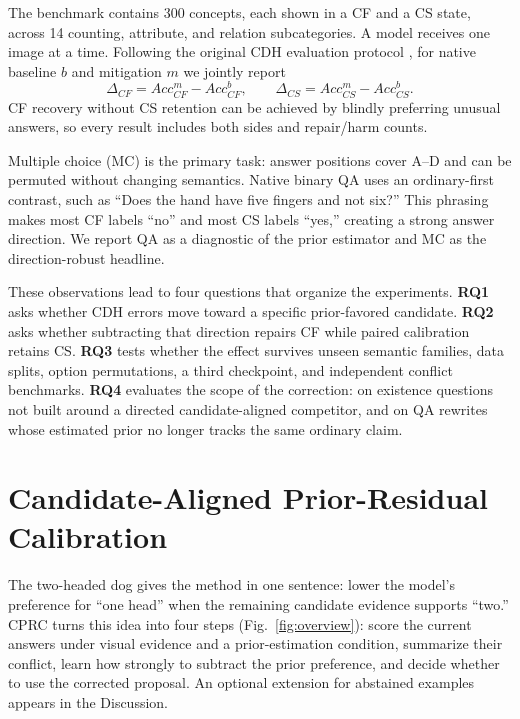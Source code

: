 \documentclass[letterpaper]{article}
\begin{document}
The benchmark contains 300 concepts, each shown in a CF and a CS state, across
14 counting, attribute, and relation subcategories. A model receives one image
at a time. Following the original CDH evaluation protocol
\cite{chen2026cdh}, for native baseline $b$ and mitigation $m$ we jointly
report
\begin{equation}
\Delta_{CF}=Acc^{m}_{CF}-Acc^{b}_{CF},\qquad
\Delta_{CS}=Acc^{m}_{CS}-Acc^{b}_{CS}.
\label{eq:deltas}
\end{equation}
CF recovery without CS retention can be achieved by blindly preferring unusual
answers, so every result includes both sides and repair/harm counts.

Multiple choice (MC) is the primary task: answer positions cover A--D and can
be permuted without changing semantics. Native binary QA uses an ordinary-first
contrast, such as ``Does the hand have five fingers and not six?'' This phrasing
makes most CF labels ``no'' and most CS labels ``yes,'' creating a strong answer
direction. We report QA as a diagnostic of the prior estimator and MC
as the direction-robust headline.

These observations lead to four questions that organize the experiments.
\textbf{RQ1} asks whether CDH errors move toward a specific prior-favored candidate.
\textbf{RQ2} asks whether subtracting that direction repairs CF while paired
calibration retains CS. \textbf{RQ3} tests whether the effect survives unseen
semantic families, data splits, option permutations, a third checkpoint, and
independent conflict benchmarks.
\textbf{RQ4} evaluates the scope of the correction: on existence questions not built
around a directed candidate-aligned competitor, and on QA rewrites whose estimated prior no longer tracks
the same ordinary claim.

\section{Candidate-Aligned Prior-Residual Calibration}

The two-headed dog gives the method in one sentence: lower the model's
preference for ``one head'' when the remaining candidate evidence
supports ``two.'' CPRC turns this idea into four steps (Fig.~\ref{fig:overview}):
score the current answers under visual evidence and a prior-estimation
condition, summarize their conflict, learn how strongly to subtract the prior
preference, and decide whether to use the corrected proposal. An optional
extension for abstained examples appears in the Discussion.
\end{document}
